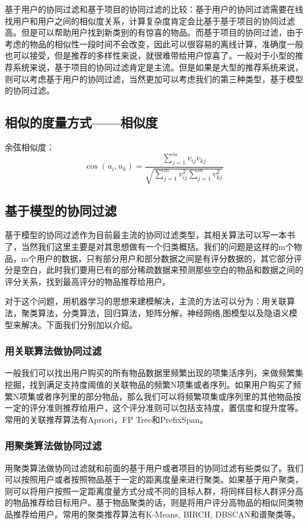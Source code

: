 \documentclass[12pt]{article}
\begin{document}
基于用户的协同过滤和基于项目的协同过滤的比较：基于用户的协同过滤需要在线找用户和用户之间的相似度关系，计算复杂度肯定会比基于基于项目的协同过滤高。但是可以帮助用户找到新类别的有惊喜的物品。而基于项目的协同过滤，由于考虑的物品的相似性一段时间不会改变，因此可以很容易的离线计算，准确度一般也可以接受，但是推荐的多样性来说，就很难带给用户惊喜了。一般对于小型的推荐系统来说，基于项目的协同过滤肯定是主流。但是如果是大型的推荐系统来说，则可以考虑基于用户的协同过滤，当然更加可以考虑我们的第三种类型，基于模型的协同过滤。

\subsection{相似的度量方式——相似度}
余弦相似度：
$$
\cos(u_i, u_k) = \frac{\sum_{j=1}^mv_{ij}v_{kj}}{\sqrt{\sum_{j=1}^mv_{ij}^2\sum_{j=1}^mv_{kj}^2}}
$$

\subsection{基于模型的协同过滤}
基于模型的协同过滤作为目前最主流的协同过滤类型，其相关算法可以写一本书了，当然我们这里主要是对其思想做有一个归类概括。我们的问题是这样的m个物品，m个用户的数据，只有部分用户和部分数据之间是有评分数据的，其它部分评分是空白，此时我们要用已有的部分稀疏数据来预测那些空白的物品和数据之间的评分关系，找到最高评分的物品推荐给用户。

对于这个问题，用机器学习的思想来建模解决，主流的方法可以分为：用关联算法，聚类算法，分类算法，回归算法，矩阵分解，神经网络,图模型以及隐语义模型来解决。下面我们分别加以介绍。

\subsubsection{用关联算法做协同过滤}
一般我们可以找出用户购买的所有物品数据里频繁出现的项集活序列，来做频繁集挖掘，找到满足支持度阈值的关联物品的频繁N项集或者序列。如果用户购买了频繁N项集或者序列里的部分物品，那么我们可以将频繁项集或序列里的其他物品按一定的评分准则推荐给用户，这个评分准则可以包括支持度，置信度和提升度等。常用的关联推荐算法有Apriori，FP Tree和PrefixSpan。

\subsubsection{用聚类算法做协同过滤}
用聚类算法做协同过滤就和前面的基于用户或者项目的协同过滤有些类似了。我们可以按照用户或者按照物品基于一定的距离度量来进行聚类。如果基于用户聚类，则可以将用户按照一定距离度量方式分成不同的目标人群，将同样目标人群评分高的物品推荐给目标用户。基于物品聚类的话，则是将用户评分高物品的相似同类物品推荐给用户。常用的聚类推荐算法有K-Means, BIRCH, DBSCAN和谱聚类等。
\end{document}
